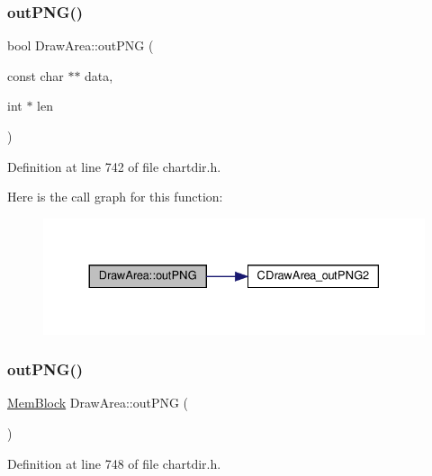 \subsubsection{\texorpdfstring{out\+P\+N\+G()}{outPNG()}\hspace{0.1cm}{\footnotesize\ttfamily [2/3]}}
{\footnotesize\ttfamily bool Draw\+Area\+::out\+P\+NG (\begin{DoxyParamCaption}\item[{const char $\ast$$\ast$}]{data,  }\item[{int $\ast$}]{len }\end{DoxyParamCaption})\hspace{0.3cm}{\ttfamily [inline]}}



Definition at line 742 of file chartdir.\+h.

Here is the call graph for this function\+:
\nopagebreak
\begin{figure}[H]
\begin{center}
\leavevmode
\includegraphics[width=330pt]{class_draw_area_a321d5bfa06ce6c67109cbd59ba656215_cgraph}
\end{center}
\end{figure}
\mbox{\label{class_draw_area_a9adee147b431fd0253e92085c5543a3e}} 
\subsubsection{\texorpdfstring{out\+P\+N\+G()}{outPNG()}\hspace{0.1cm}{\footnotesize\ttfamily [3/3]}}
{\footnotesize\ttfamily \hyperlink{class_mem_block}{Mem\+Block} Draw\+Area\+::out\+P\+NG (\begin{DoxyParamCaption}{ }\end{DoxyParamCaption})\hspace{0.3cm}{\ttfamily [inline]}}



Definition at line 748 of file chartdir.\+h.

